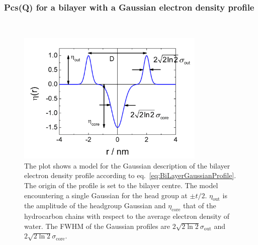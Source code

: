 \clearpage

\subsubsection{Pcs(Q) for a bilayer with a Gaussian electron density profile \cite{Pabst2000,Pabst2003}} ~\\
\label{plugin:Pcs:GaussianProfile}

\begin{figure}[htb]
\begin{center}
\includegraphics[width=0.8\textwidth,height=0.55\textwidth]{../images/form_factor/anisotropic/BiLayerGauss_Profile.png}
\end{center}
\caption{
The plot shows a model for the Gaussian description of the bilayer electron density profile according to
eq.\ \ref{eq:BiLayerGaussianProfile}.
The origin of the profile is set to the bilayer centre. The model encountering a single Gaussian for the head
group at $\pm t/2$. $\eta_\textrm{out}$ is the amplitude of the headgroup Gaussian and $\eta_\textrm{core}$ that of
the hydrocarbon chains with respect to the average electron density of water. The FWHM of the Gaussian profiles are
$2\sqrt{2\ln 2}\sigma_\textrm{out}$ and $2\sqrt{2\ln 2}\sigma_\textrm{core}$.}
\label{fig:bilayerprofile}
\end{figure}

